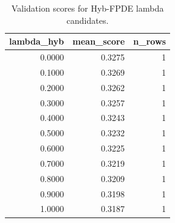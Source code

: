 \begin{table}[t]
\caption{Validation scores for Hyb-FPDE lambda candidates.}
\label{tab:lambda_distribution_computed}
\centering
\begin{tabular}{rrr}
\toprule
lambda\_hyb & mean\_score & n\_rows \\
\midrule
0.0000 & 0.3275 & 1 \\
0.1000 & 0.3269 & 1 \\
0.2000 & 0.3262 & 1 \\
0.3000 & 0.3257 & 1 \\
0.4000 & 0.3243 & 1 \\
0.5000 & 0.3232 & 1 \\
0.6000 & 0.3225 & 1 \\
0.7000 & 0.3219 & 1 \\
0.8000 & 0.3209 & 1 \\
0.9000 & 0.3198 & 1 \\
1.0000 & 0.3187 & 1 \\
\bottomrule
\end{tabular}

\end{table}
